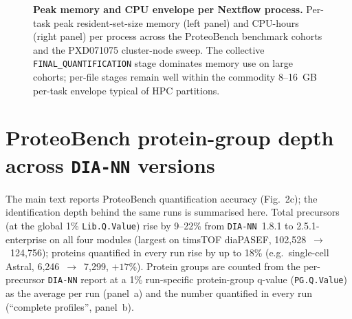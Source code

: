 \documentclass[preprint,12pt]{elsarticle}
\begin{document}
\begin{figure}[htbp]
  \centering
  \caption[Resources per task]{%
    \textbf{Peak memory and CPU envelope per Nextflow process.}
    Per-task peak resident-set-size memory (left panel) and CPU-hours
    (right panel) per \quantmsdiann{} process across the ProteoBench
    benchmark cohorts and the PXD071075 cluster-node sweep. The collective
    \texttt{FINAL\_QUANTIFICATION} stage
    dominates memory use on large cohorts; per-file stages remain well
    within the commodity 8--16~GB per-task envelope typical of HPC
    partitions.
  }
  \label{fig:resources-per-step}
\end{figure}

\section{ProteoBench protein-group depth across \texttt{DIA-NN} versions}
\label{sec:supp-proteobench-proteins}

The main text reports ProteoBench quantification accuracy (Fig.~2c); the
identification depth behind the same runs is summarised here. Total precursors
(at the global 1\% \texttt{Lib.Q.Value}) rise by 9--22\% from \texttt{DIA-NN}~1.8.1 to
2.5.1-enterprise on all four modules (largest on timsTOF diaPASEF,
102{,}528~$\to$~124{,}756); proteins quantified in every run rise by up to 18\%
(e.g.\ single-cell Astral, 6{,}246~$\to$~7{,}299, $+17$\%). Protein groups are
counted from the per-precursor \texttt{DIA-NN} report at a 1\% run-specific
protein-group q-value (\texttt{PG.Q.Value}) as the average per run (panel~a) and the
number quantified in every run (``complete profiles'', panel~b).
\end{document}
